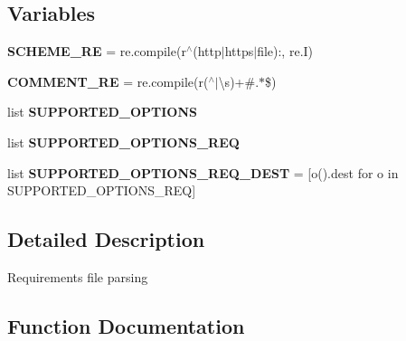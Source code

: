 \subsection*{Variables}
\begin{DoxyCompactItemize}
\item 
\mbox{\label{namespacepip_1_1req_1_1req__file_a9f028e33de24f011056cc22578ec4ae0}} 
{\bfseries S\+C\+H\+E\+M\+E\+\_\+\+RE} = re.\+compile(r\textquotesingle{}$^\wedge$(http$\vert$https$\vert$file)\+:\textquotesingle{}, re.\+I)
\item 
\mbox{\label{namespacepip_1_1req_1_1req__file_a980aac20ad33f8e1b6ceaab9585c53d9}} 
{\bfseries C\+O\+M\+M\+E\+N\+T\+\_\+\+RE} = re.\+compile(r\textquotesingle{}($^\wedge$$\vert$\textbackslash{}s)+\#.$\ast$\$\textquotesingle{})
\item 
list {\bfseries S\+U\+P\+P\+O\+R\+T\+E\+D\+\_\+\+O\+P\+T\+I\+O\+NS}
\item 
list {\bfseries S\+U\+P\+P\+O\+R\+T\+E\+D\+\_\+\+O\+P\+T\+I\+O\+N\+S\+\_\+\+R\+EQ}
\item 
\mbox{\label{namespacepip_1_1req_1_1req__file_afa9498b576054c09cfd1194f8308bc3a}} 
list {\bfseries S\+U\+P\+P\+O\+R\+T\+E\+D\+\_\+\+O\+P\+T\+I\+O\+N\+S\+\_\+\+R\+E\+Q\+\_\+\+D\+E\+ST} = \mbox{[}o().dest for o in S\+U\+P\+P\+O\+R\+T\+E\+D\+\_\+\+O\+P\+T\+I\+O\+N\+S\+\_\+\+R\+EQ\mbox{]}
\end{DoxyCompactItemize}


\subsection{Detailed Description}
\begin{DoxyVerb}Requirements file parsing
\end{DoxyVerb}
 

\subsection{Function Documentation}
\mbox{\label{namespacepip_1_1req_1_1req__file_ac5064ff435fdfbb72795742c823172ba}} 
